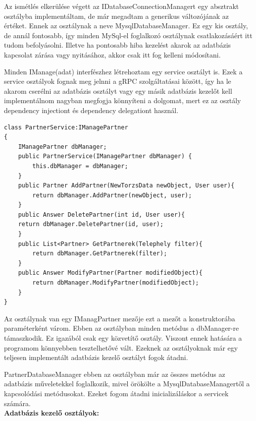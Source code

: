 \documentclass[
]{thesis-ekf}
\theoremstyle{definition}
\theoremstyle{remark}
\begin{document}
Az ismétlés elkerülése végett az IDatabaseConnectionManagert egy absztrakt osztályba implementáltam, de már megadtam a generikus változójának az értéket. Ennek az osztálynak a neve MysqlDatabaseManager. Ez egy kis osztály, de annál fontosabb, így minden MySql-el foglalkozó osztálynak csatlakozásáért itt tudom befolyásolni. Illetve ha pontosabb hiba kezelést akarok az adatbázis kapcsolat zárása vagy nyitásához, akkor csak itt fog kelleni módosítani.

Minden IManage(adat) interfészhez létrehoztam egy service osztályt is. Ezek a service osztályok fognak meg jelnni a gRPC szolgáltatásai között, így ha le akarom cserélni az adatbázis osztályt vagy egy másik adatbázis kezelőt kell implementálnom nagyban megfogja könnyíteni a dolgomat, mert ez az osztály dependency injectiont és dependency delegationt használ. 
\begin{lstlisting}
class PartnerService:IManagePartner
{
	IManagePartner dbManager;
	public PartnerService(IManagePartner dbManager)	{
		this.dbManager = dbManager;
	}
	public Partner AddPartner(NewTorzsData newObject, User user){
		return dbManager.AddPartner(newObject, user);
	}
	public Answer DeletePartner(int id, User user){
	return dbManager.DeletePartner(id, user);
	}
	public List<Partner> GetPartnerek(Telephely filter){
		return dbManager.GetPartnerek(filter);
	}
	public Answer ModifyPartner(Partner modifiedObject){
		return dbManager.ModifyPartner(modifiedObject);
	}
}

\end{lstlisting}
Az osztálynak van egy IManagPartner mezője ezt a mezőt a konstruktorába paraméterként várom. Ebben az osztályban minden metódus a dbManager-re támaszkodik. Ez igazából csak egy közvetítő osztály. Viszont ennek hatására a programom könnyebben tesztelhetővé vált. Ezeknek az osztályoknak már egy teljesen implementált adatbázis kezelő osztályt fogok átadni.

PartnerDatabaseManager ebben az osztályban már az összes metódus az adatbázis műveletekkel foglalkozik, mivel örökölte a MysqlDatabaseManagertől a kapcsolódási metódusokat. Ezeket fogom átadni inicializáláskor a servicek számára.\\
\textbf{Adatbázis kezelő osztályok:}
\end{document}

